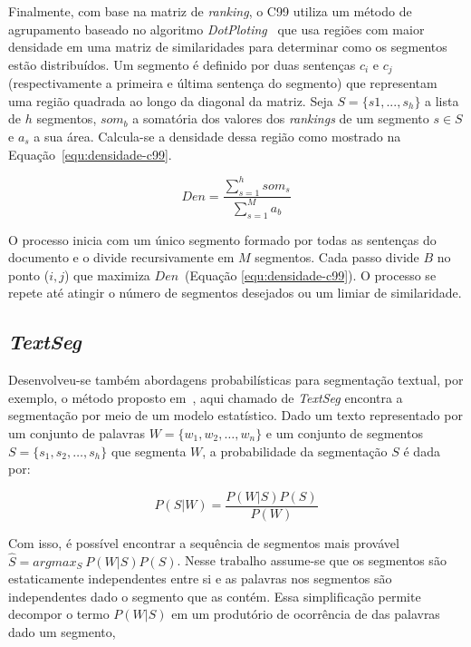 Finalmente, com base na matriz de \textit{ranking}, o C99 utiliza um método de agrupamento baseado no algoritmo \textit{DotPloting}~\cite{Reynar1998} que usa regiões com maior densidade em uma matriz de similaridades para determinar como os segmentos estão distribuídos.  
% 
Um segmento é definido por duas sentenças $c_i$ e $c_j$ (respectivamente a primeira e última sentença do segmento) que representam uma região quadrada ao longo da diagonal da matriz. 
% 
Seja $S = \{s1,...,s_h\}$ a lista de $h$ segmentos,  $som_b$ a somatória dos valores dos \textit{rankings} de um segmento $s \in S$ e $a_s$ a sua área. 
% 
Calcula-se a densidade dessa região como mostrado na Equação~\ref{equ:densidade-c99}. 



\begin{equation}
Den = \frac{\sum_{s=1}^h som_s}{\sum_{s=1}^M a_b}
\label{equ:densidade-c99}
\end{equation}


O processo inicia com um único segmento formado por todas as sentenças do documento e o divide recursivamente em $M$ segmentos. Cada passo divide $B$ no ponto ($i,j$) que maximiza $Den$~(Equação \ref{equ:densidade-c99}). O processo se repete até atingir o número de segmentos desejados ou um limiar de similaridade.





\subsection*{\textit{TextSeg}}


Desenvolveu-se também abordagens probabilísticas para segmentação textual, por exemplo, o método proposto em~\cite{Utiyama2001}, aqui chamado de \textit{TextSeg} encontra a segmentação por meio de um modelo estatístico. Dado um texto representado por um conjunto de palavras 
$W = \{w_1, w_2, \dots, w_n\}$ e um conjunto de segmentos $S = \{s_1, s_2, \dots, s_h\}$ que segmenta $W$, a probabilidade da segmentação $S$ é dada por:

\begin{equation}
	P(S|W) = \frac{P(W|S)P(S)}{P(W)}
\end{equation}

Com isso, é possível encontrar a sequência de segmentos mais provável $\hat{S} = arg max_S~P(W|S) P(S)$. Nesse trabalho assume-se que os segmentos são estaticamente independentes entre si e as palavras nos segmentos são independentes dado o segmento que as contém. Essa simplificação permite decompor o termo $P(W|S)$ em um produtório de ocorrência de das palavras dado um segmento,  

